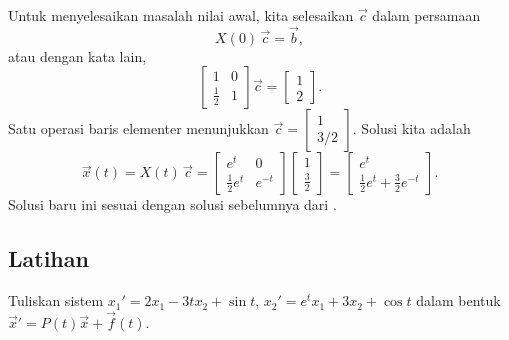 \begin{example}
Untuk menyelesaikan masalah nilai awal, kita selesaikan $\vec{c}$ dalam persamaan
\begin{equation*}
X(0)\,\vec{c} = \vec{b} ,
\end{equation*}
atau dengan kata lain,
\begin{equation*}
\begin{bmatrix}
1 & 0 \\
\frac{1}{2} & 1
\end{bmatrix}
\vec{c} =
\begin{bmatrix}
1 \\ 2
\end{bmatrix} .
\end{equation*}
Satu operasi baris elementer menunjukkan
$\vec{c} =
\left[ \begin{smallmatrix} 1 \\ 3/2 \end{smallmatrix} \right]$.
Solusi kita adalah
\begin{equation*}
\vec{x}(t) =
X(t)\,\vec{c} =
\begin{bmatrix}
e^t & 0 \\
\frac{1}{2} e^t & e^{-t}
\end{bmatrix}
\begin{bmatrix}
1 \\ \frac{3}{2}
\end{bmatrix} =
\begin{bmatrix}
e^t \\
\frac{1}{2} e^t + \frac{3}{2} e^{-t}
\end{bmatrix} .
\end{equation*}
Solusi baru ini sesuai dengan solusi sebelumnya dari .
\end{example}

\subsection{Latihan}

\begin{exercise}
Tuliskan sistem $x_1' = 2 x_1 - 3t x_2 + \sin t$,
$x_2' = e^t x_1 + 3 x_2 + \cos t$ dalam bentuk
${\vec{x}}' = P(t) \vec{x} + \vec{f}(t)$.
\end{exercise}

